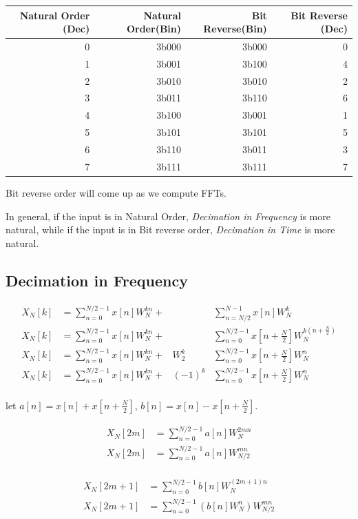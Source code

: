 \documentclass{article}
\begin{document}
\begin{tabular}{ | r | r | r | r | }
    \hline
    Natural Order (Dec) & Natural Order(Bin) & Bit Reverse(Bin) & Bit Reverse (Dec) \\
    \hline
    0 & 3b000 & 3b000 & 0 \\
    1 & 3b001 & 3b100 & 4 \\
    2 & 3b010 & 3b010 & 2 \\
    3 & 3b011 & 3b110 & 6 \\
    4 & 3b100 & 3b001 & 1 \\
    5 & 3b101 & 3b101 & 5 \\
    6 & 3b110 & 3b011 & 3 \\
    7 & 3b111 & 3b111 & 7 \\
    \hline
\end{tabular}

Bit reverse order will come up as we compute FFTs.

In general, if the input is in Natural Order, \emph{Decimation in Frequency} is more natural, while if the input is in
Bit reverse order, \emph{Decimation in Time} is more natural.

\pagebreak
\subsection{Decimation in Frequency}

\begin{align*}
    X_{N}[k] &= \sum_{n=0}^{N/2-1} x[n] W_{N}^{kn} + &                     & \sum_{n=N/2}^{N-1} x[n] W_{N}^{k} \\
    X_{N}[k] &= \sum_{n=0}^{N/2-1} x[n] W_{N}^{kn} + &                     & \sum_{n=0}^{N/2-1} x[n+\frac{N}{2}] W_{N}^{k\left(n + \frac{N}{2}\right)} \\
    X_{N}[k] &= \sum_{n=0}^{N/2-1} x[n] W_{N}^{kn} + & W_{2}^{k}           & \sum_{n=0}^{N/2-1} x[n+\frac{N}{2}] W_{N}^{n} \\
    X_{N}[k] &= \sum_{n=0}^{N/2-1} x[n] W_{N}^{kn} + & \left(-1\right)^{k} & \sum_{n=0}^{N/2-1} x[n+\frac{N}{2}] W_{N}^{n} \\
\end{align*}

let $a[n] = x[n] + x[n+\frac{N}{2}]$, $b[n] = x[n] - x[n+\frac{N}{2}]$.

\begin{minipage}{0.5\textwidth}
  \begin{align*}
    X_{N}[2m]   &= \sum_{n=0}^{N/2-1} a[n] W_{N}^{2mn} \\
    X_{N}[2m]   &= \sum_{n=0}^{N/2-1} a[n] W_{N/2}^{mn} \\
  \end{align*}
\end{minipage}
\begin{minipage}{0.5\textwidth}
  \begin{align*}
    X_{N}[2m+1] &= \sum_{n=0}^{N/2-1} b[n] W_{N}^{\left(2m+1\right)n} \\
    X_{N}[2m+1] &= \sum_{n=0}^{N/2-1} \left(b[n] W_{N}^{n} \right) W_{N/2}^{mn} \\
  \end{align*}
\end{minipage}
\end{document}
